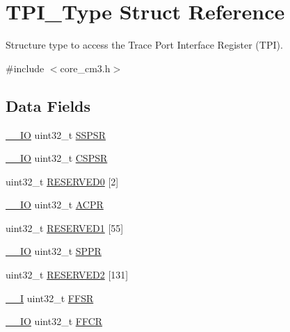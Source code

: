 \hypertarget{struct_t_p_i___type}{}\section{T\+P\+I\+\_\+\+Type Struct Reference}
\label{struct_t_p_i___type}


Structure type to access the Trace Port Interface Register (T\+PI).  




{\ttfamily \#include $<$core\+\_\+cm3.\+h$>$}

\subsection*{Data Fields}
\begin{DoxyCompactItemize}
\item 
\mbox{\hyperlink{core__sc300_8h_aec43007d9998a0a0e01faede4133d6be}{\+\_\+\+\_\+\+IO}} uint32\+\_\+t \mbox{\hyperlink{struct_t_p_i___type_ad6abd8c7878d64e5e8e442de842f9de8}{S\+S\+P\+SR}}
\item 
\mbox{\hyperlink{core__sc300_8h_aec43007d9998a0a0e01faede4133d6be}{\+\_\+\+\_\+\+IO}} uint32\+\_\+t \mbox{\hyperlink{struct_t_p_i___type_a473c1ca66cec890b536d9c9a13a2d8c2}{C\+S\+P\+SR}}
\item 
uint32\+\_\+t \mbox{\hyperlink{struct_t_p_i___type_af2c92c7cb13569aaff6b4f5a25de5056}{R\+E\+S\+E\+R\+V\+E\+D0}} \mbox{[}2\mbox{]}
\item 
\mbox{\hyperlink{core__sc300_8h_aec43007d9998a0a0e01faede4133d6be}{\+\_\+\+\_\+\+IO}} uint32\+\_\+t \mbox{\hyperlink{struct_t_p_i___type_a4bdbe4ff58983d940ca72d8733feaedd}{A\+C\+PR}}
\item 
uint32\+\_\+t \mbox{\hyperlink{struct_t_p_i___type_ab90aea487bf1662e59617af05b30f253}{R\+E\+S\+E\+R\+V\+E\+D1}} \mbox{[}55\mbox{]}
\item 
\mbox{\hyperlink{core__sc300_8h_aec43007d9998a0a0e01faede4133d6be}{\+\_\+\+\_\+\+IO}} uint32\+\_\+t \mbox{\hyperlink{struct_t_p_i___type_a102814b254904beb9060757a93fe526c}{S\+P\+PR}}
\item 
uint32\+\_\+t \mbox{\hyperlink{struct_t_p_i___type_a4e4e19be116d8ccdcb242401cfb3048b}{R\+E\+S\+E\+R\+V\+E\+D2}} \mbox{[}131\mbox{]}
\item 
\mbox{\hyperlink{core__sc300_8h_af63697ed9952cc71e1225efe205f6cd3}{\+\_\+\+\_\+I}} uint32\+\_\+t \mbox{\hyperlink{struct_t_p_i___type_ab1bcdedfb12eaebecde53a7add7f9f84}{F\+F\+SR}}
\item 
\mbox{\hyperlink{core__sc300_8h_aec43007d9998a0a0e01faede4133d6be}{\+\_\+\+\_\+\+IO}} uint32\+\_\+t \mbox{\hyperlink{struct_t_p_i___type_a511d496d51cf81ccef6e97fd1d5abe31}{F\+F\+CR}}

\end{DoxyCompactItemize}
